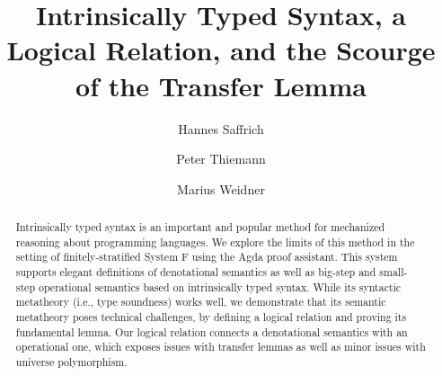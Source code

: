 \documentclass[sigplan,anonymous,review,screen]{acmart}
\begin{document}
\title{Intrinsically Typed Syntax, a Logical Relation, and the Scourge of the Transfer Lemma}

\author{Hannes Saffrich}


\author{Peter Thiemann}

\author{Marius Weidner}


\begin{abstract}
Intrinsically typed syntax is an important and popular method for
mechanized reasoning about programming languages.
We explore the limits of this method in the setting of
finitely-stratified System F using the Agda proof assistant. This
system supports elegant definitions of 
denotational semantics as well as big-step 
and small-step operational semantics based on intrinsically typed syntax. While its syntactic
metatheory (i.e., type soundness) works well,
we demonstrate that its semantic metatheory poses technical
challenges, by defining a logical relation and proving its fundamental
lemma.
Our logical relation connects a denotational semantics with an
operational one, which exposes issues with transfer lemmas as well as
minor issues with universe polymorphism.
\end{abstract}
\end{document}
